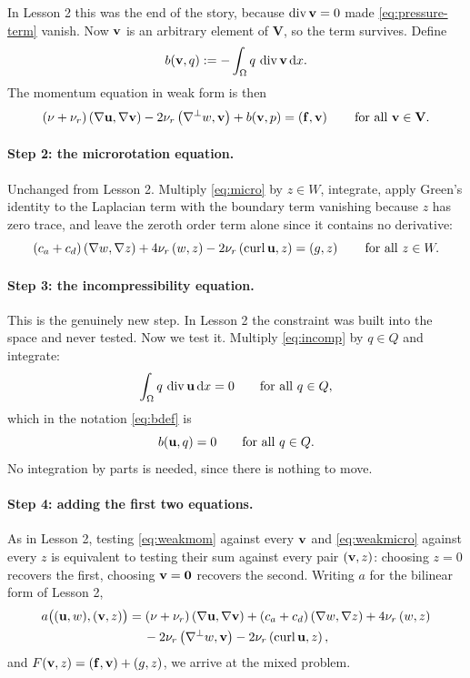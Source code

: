 \documentclass[11pt,a4paper]{article}
\newcommand{\Vsp}{\mathbf{V}}
\newcommand{\Qsp}{Q}
\newcommand{\Wsp}{W}
\newcommand{\bff}{\mathbf{f}}
\newcommand{\bzero}{\mathbf{0}}
\begin{document}
In Lesson 2 this was the end of the story, because $\operatorname{div} \mathbf{v} = 0$ made
\eqref{eq:pressure-term} vanish. Now $\mathbf{v}$ is an arbitrary element of $\Vsp$, so
the term survives. Define
\begin{equation}\label{eq:bdef}
  b(\mathbf{v}, q) := - \int_\Omega q \,\operatorname{div} \mathbf{v} \,\mathrm{d}x .
\end{equation}
The momentum equation in weak form is then
\begin{equation}\label{eq:weakmom}
  (\nu+\nu_{r})\ip{\grad \bu}{\grad \bv} - 2\nu_{r}\ip{\grad^{\perp}w}{\bv}
  + b(\bv, p) = \ip{\bff}{\bv}
  \qquad \text{for all } \bv \in \Vsp .
\end{equation}

\paragraph{Step 2: the microrotation equation.}
Unchanged from Lesson 2. Multiply \eqref{eq:micro} by $z \in \Wsp$, integrate,
apply Green's identity to the Laplacian term with the boundary term vanishing
because $z$ has zero trace, and leave the zeroth order term alone since it
contains no derivative:
\begin{equation}\label{eq:weakmicro}
  (c_{a}+c_{d})\ip{\grad w}{\grad z} + 4\nu_{r}\ip{w}{z}
  - 2\nu_{r}\ip{\curl \bu}{z} = \ip{g}{z}
  \qquad \text{for all } z \in \Wsp .
\end{equation}

\paragraph{Step 3: the incompressibility equation.}
This is the genuinely new step. In Lesson 2 the constraint was built into the
space and never tested. Now we test it. Multiply \eqref{eq:incomp} by
$q \in \Qsp$ and integrate:
\[
  \int_\Om q \,\dive \bu \dx = 0
  \qquad \text{for all } q \in \Qsp ,
\]
which in the notation \eqref{eq:bdef} is
\begin{equation}\label{eq:weakincomp}
  b(\bu, q) = 0 \qquad \text{for all } q \in \Qsp .
\end{equation}
No integration by parts is needed, since there is nothing to move.

\paragraph{Step 4: adding the first two equations.}
As in Lesson 2, testing \eqref{eq:weakmom} against every $\mathbf{v}$ and
\eqref{eq:weakmicro} against every $z$ is equivalent to testing their sum
against every pair $(\mathbf{v},z)$: choosing $z = 0$ recovers the first, choosing
$\bv = \bzero$ recovers the second. Writing $a$ for the bilinear form of Lesson
2,
\begin{multline}\label{eq:adef}
  a\big( (\mathbf{u},w),(\mathbf{v},z) \big)
  = (\nu+\nu_{r})\left( \nabla \mathbf{u} , \nabla \mathbf{v} \right)
  + (c_{a}+c_{d})\left( \nabla w , \nabla z \right)
  + 4\nu_{r}\left( w , z \right) \\
  {} - 2\nu_{r}\left( \nabla^{\perp}w , \mathbf{v} \right) - 2\nu_{r}\left( \operatorname{curl} \mathbf{u} , z \right) ,
\end{multline}
and $F(\bv,z) = \ip{\bff}{\bv} + \ip{g}{z}$, we arrive at the mixed problem.
\end{document}
